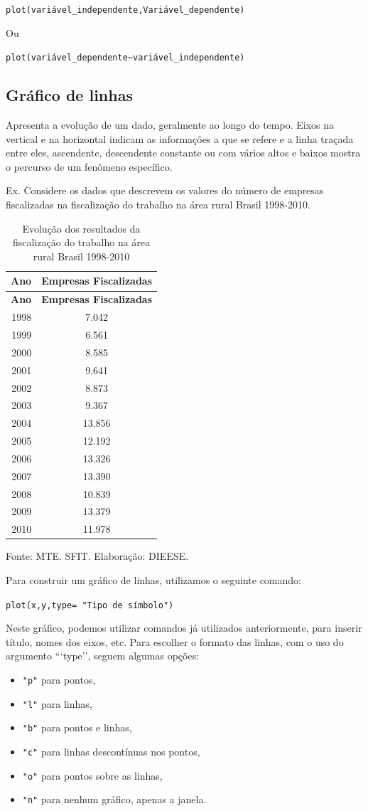 \documentclass[12pt,brazil,]{book}
\providecommand{\tightlist}{%
  \setlength{\itemsep}{0pt}\setlength{\parskip}{0pt}}
\begin{document}
\texttt{plot(variável\_independente,Variável\_dependente)}

Ou

\texttt{plot(variável\_dependente\textasciitilde{}variável\_independente)}

\hypertarget{grafico-de-linhas}{%
\subsection{Gráfico de linhas}\label{grafico-de-linhas}}

Apresenta a evolução de um dado, geralmente ao longo do tempo. Eixos na
vertical e na horizontal indicam as informações a que se refere e a
linha traçada entre eles, ascendente, descendente constante ou com
vários altos e baixos mostra o percurso de um fenômeno específico.

Ex. Considere os dados que descrevem os valores do número de empresas
fiscalizadas na fiscalização do trabalho na área rural Brasil 1998-2010.

\begin{longtable}[]{@{}rc@{}}
\caption{\label{tab:evolres}Evolução dos resultados da fiscalização do
trabalho na área rural Brasil 1998-2010}\tabularnewline
\toprule
\textbf{Ano} & \textbf{Empresas Fiscalizadas}\tabularnewline
\midrule
\endfirsthead
\toprule
\textbf{Ano} & \textbf{Empresas Fiscalizadas}\tabularnewline
\midrule
\endhead
1998 & 7.042\tabularnewline
1999 & 6.561\tabularnewline
2000 & 8.585\tabularnewline
2001 & 9.641\tabularnewline
2002 & 8.873\tabularnewline
2003 & 9.367\tabularnewline
2004 & 13.856\tabularnewline
2005 & 12.192\tabularnewline
2006 & 13.326\tabularnewline
2007 & 13.390\tabularnewline
2008 & 10.839\tabularnewline
2009 & 13.379\tabularnewline
2010 & 11.978\tabularnewline
\bottomrule
\end{longtable}

Fonte: MTE. SFIT. Elaboração: DIEESE.

Para construir um gráfico de linhas, utilizamos o seguinte comando:

\texttt{plot(x,y,type=\ "Tipo\ de\ símbolo")}

Neste gráfico, podemos utilizar comandos já utilizados anteriormente,
para inserir título, nomes dos eixos, etc. Para escolher o formato das
linhas, com o uso do argumento ```type''\textbar{}, seguem algumas
opções:

\begin{itemize}
\tightlist
\item
  \texttt{"p"} para pontos,
\item
  \texttt{"l"} para linhas,
\item
  \texttt{"b"} para pontos e linhas,
\item
  \texttt{"c"} para linhas descontínuas nos pontos,
\item
  \texttt{"o"} para pontos sobre as linhas,
\item
  \texttt{"n"} para nenhum gráfico, apenas a janela.
\end{itemize}
\end{document}

